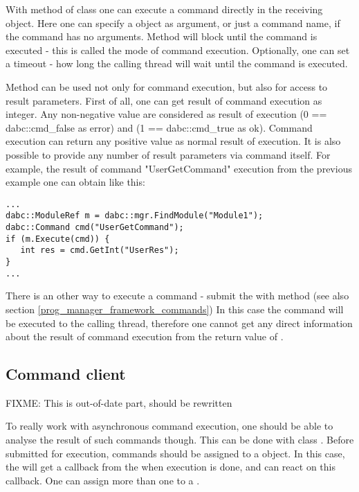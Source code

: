 With method  of class  one can execute 
a command directly in the receiving object. 
Here one can specify a  object as argument,
or just a command name, if the command has no arguments. 
Method  will block
until the command is executed - this is called the   
mode of command execution. Optionally, one can set a timeout - how long the calling thread will wait until the command is executed. 

Method  can be used not only for command execution,
but also for access to result parameters. First of all, one can get result of command execution
as integer. Any non-negative value are considered as result of execution (0 == dabc::cmd_false as error)
and (1 == dabc::cmd_true as ok). Command execution can return any positive value as normal result of execution.
It is also possible to provide any number of result parameters via command itself.
For example, the result of command "UserGetCommand" execution from the previous 
example one can obtain like this:  

\begin{small}
\begin{verbatim}
...
dabc::ModuleRef m = dabc::mgr.FindModule("Module1");
dabc::Command cmd("UserGetCommand");
if (m.Execute(cmd)) {
   int res = cmd.GetInt("UserRes");
}
...
\end{verbatim}     
\end{small}


There is an other way to execute a command - submit 
the  with  method
(see also  section \ref{prog_manager_framework_commands})
In this case the command will be executed  to the calling thread, therefore one cannot get any direct information about the result of command execution
from the return value of .


\subsection{Command client}

FIXME: This is out-of-date part, should be rewritten

To really work with asynchronous command execution, one should be able to analyse the 
result of such commands though. This can be done with class .
Before submitted for execution, commands should be assigned 
to a  object.
In this case, the 
will get a callback from the  when execution is done,
and can react on this callback.
One can assign more than one  to a  .

